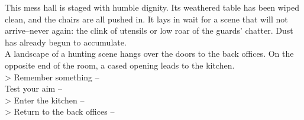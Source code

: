 This mess hall is staged with humble dignity. Its weathered table has been wiped clean, and the chairs are all pushed in. It lays in wait for a scene that will not arrive--never again: the clink of utensils or low roar of the guards' chatter. Dust has already begun to accumulate.\\

A landscape of a hunting scene hangs over the doors to the back offices. On the opposite end of the room, a cased opening leads to the kitchen.\\

> Remember something -- \\
 Test your aim -- \\
> Enter the kitchen -- \\
> Return to the back offices -- 